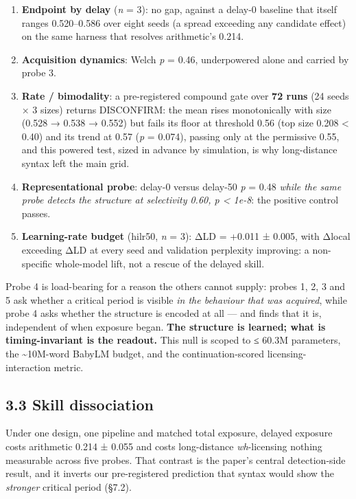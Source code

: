 \documentclass[11pt]{article}
\providecommand{\tightlist}{\setlength{\itemsep}{0pt}\setlength{\parskip}{0pt}}
\begin{document}
\begin{enumerate}
\def\labelenumi{\arabic{enumi}.}
\tightlist
\item
  \textbf{Endpoint by delay} (\emph{n} = 3): no gap, against a delay-0 baseline that itself ranges
  0.520--0.586 over eight seeds (a spread exceeding any candidate effect) on the same
  harness that resolves arithmetic's 0.214.
\item
  \textbf{Acquisition dynamics}: Welch \emph{p} = 0.46, underpowered alone and carried by probe 3.
\item
  \textbf{Rate / bimodality}: a pre-registered compound gate over \textbf{72 runs} (24 seeds × 3
  sizes) returns DISCONFIRM: the mean rises monotonically with size (0.528 → 0.538 →
  0.552) but fails its floor at threshold 0.56 (top size 0.208 \textless{} 0.40) and its trend at
  0.57 (\emph{p} = 0.074), passing only at the permissive 0.55, and this powered test, sized in
  advance by simulation, is why long-distance syntax left the main grid.
\item
  \textbf{Representational probe}: delay-0 versus delay-50 \emph{p} = 0.48 \emph{while the same probe
  detects the structure at selectivity 0.60, p \textless{} 1e-8}: the positive control passes.
\item
  \textbf{Learning-rate budget} (hilr50, \emph{n} = 3): ΔLD = +0.011 ± 0.005, with Δlocal exceeding
  ΔLD at every seed and validation perplexity improving: a non-specific whole-model lift,
  not a rescue of the delayed skill.
\end{enumerate}

Probe 4 is load-bearing for a reason the others cannot supply: probes 1, 2, 3 and 5 ask
whether a critical period is visible \emph{in the behaviour that was acquired}, while probe 4 asks
whether the structure is encoded at all — and finds that it is, independent of when exposure
began. \textbf{The structure is learned; what is timing-invariant is the readout.} This null is
scoped to ≤ 60.3M parameters, the \textasciitilde10M-word BabyLM budget, and the continuation-scored
licensing-interaction metric.

\subsection{3.3 Skill dissociation}\label{skill-dissociation}

Under one design, one pipeline and matched total exposure, delayed exposure costs arithmetic
0.214 ± 0.055 and costs long-distance \emph{wh}-licensing nothing measurable across five probes.
That contrast is the paper's central detection-side result, and it inverts our
pre-registered prediction that syntax would show the \emph{stronger} critical period (§7.2).
\end{document}
